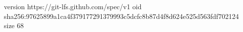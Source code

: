 version https://git-lfs.github.com/spec/v1
oid sha256:97625899a1ca4f379177291379993c5dcfc8b87d4f8d624e525d563fdf702124
size 68
